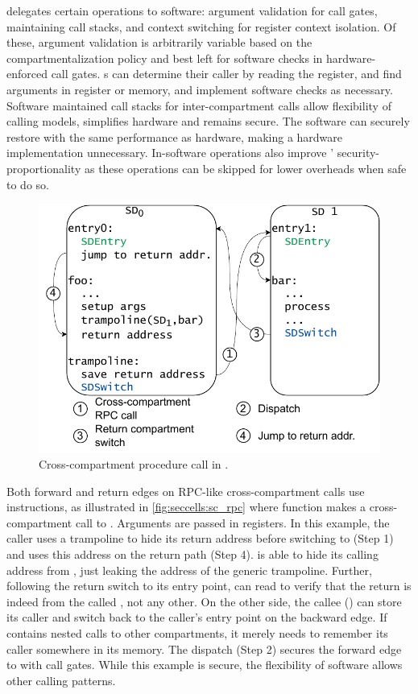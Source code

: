 \seccells delegates certain operations to software: 
argument validation for call gates, 
maintaining call stacks, and context switching for register context isolation.
Of these, argument validation is arbitrarily variable based on the
compartmentalization policy and best left for software checks in 
hardware-enforced call gates.
\secdiv{}s can determine their caller by reading the \rid 
register, and find arguments in register or memory, and implement
software checks as necessary.
Software maintained call stacks for inter-compartment calls 
allow flexibility of calling models,
simplifies hardware and remains secure.
The software can securely restore with the same performance as hardware,
making a hardware implementation unnecessary.
In-software operations also improve \seccells' security-proportionality
as these operations can be skipped for lower overheads when safe to do so.

\begin{figure}
  \centering
  \includegraphics[width=0.7\linewidth]{media/seccells/sc_rpc.pdf}
  \caption{Cross-compartment procedure call in \seccells.}
  \label{fig:seccells:sc_rpc}
\end{figure}

Both forward and return edges on RPC-like cross-compartment 
calls use \sdswitch instructions, as illustrated in \autoref{fig:seccells:sc_rpc} 
where function  makes a cross-compartment call to .
Arguments are passed in registers.
In this example, the caller uses a trampoline to hide its return address
before switching to  (Step 1) and uses this address on the 
return path (Step 4).
 is able to hide its calling address from , just
leaking the address of the generic trampoline.
Further, following the return switch to its entry point, 
can read \rid to verify that the return is indeed from the called 
\secdiv, not any other.
On the other side, the callee () can store its caller and
switch back to the caller's entry point on the backward edge.
If  contains nested calls to other compartments, it
merely needs to remember its caller somewhere in its memory.
The dispatch (Step 2) secures the forward edge to  with call
gates.
While this example is secure, the flexibility of software allows other
calling patterns.


